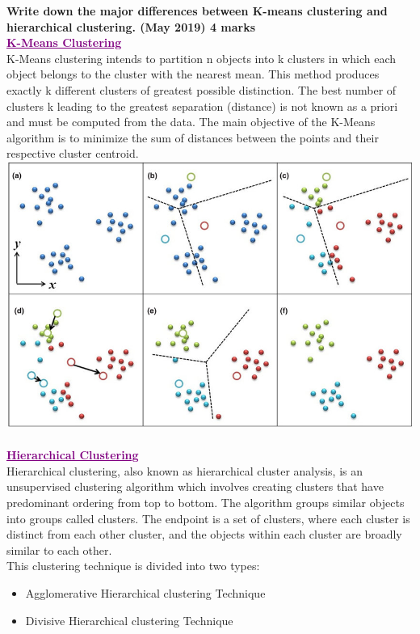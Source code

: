 
\textbf{\textcolor{LightMagenta}{Write down the major differences between K-means clustering and hierarchical clustering. (May 2019) \hfill 4 marks}} \\[5pt]
\textcolor{purple}{\underline{\textbf{K-Means Clustering}}}\\
K-Means clustering intends to partition n objects into k clusters in which each object belongs to the cluster with the nearest mean. This method produces exactly k different clusters of greatest possible distinction. The best number of clusters k leading to the greatest separation (distance) is not known as a priori and must be computed from the data. The main objective of the K-Means algorithm is to minimize the sum of distances between the points and their respective cluster centroid. \\ 
\includegraphics[scale=0.45]{Images/A33_img1.png} 
\\ \\
\textcolor{purple}{\underline{\textbf{Hierarchical Clustering}}}\\
Hierarchical clustering, also known as hierarchical cluster analysis, is an unsupervised clustering algorithm which involves creating clusters that have predominant ordering from top to bottom. The algorithm groups similar objects into groups called clusters. The endpoint is a set of clusters, where each cluster is distinct from each other cluster, and the objects within each cluster are broadly similar to each other. \\
This clustering technique is divided into two types: 
\begin{itemize}
    \item {Agglomerative Hierarchical clustering Technique} 
    \item {Divisive Hierarchical clustering Technique} 
\end{itemize}

